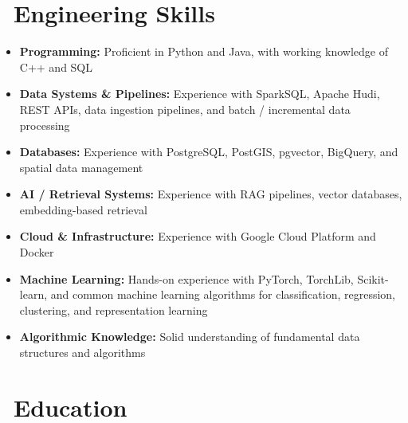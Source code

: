 \documentclass{resume}
\begin{document}
\section{\faCogs\ \textbf{Engineering Skills}}

\begin{itemize}[parsep=0.4ex]

\item \textbf{Programming:} Proficient in Python and Java, with working knowledge of C++ and SQL

\item \textbf{Data Systems \& Pipelines:} Experience with SparkSQL, Apache Hudi, REST APIs, data ingestion pipelines, and batch / incremental data processing

\item \textbf{Databases:} Experience with PostgreSQL, PostGIS, pgvector, BigQuery, and spatial data management

\item \textbf{AI / Retrieval Systems:} Experience with RAG pipelines, vector databases, embedding-based retrieval

\item \textbf{Cloud \& Infrastructure:} Experience with Google Cloud Platform and Docker

\item \textbf{Machine Learning:} Hands-on experience with PyTorch, TorchLib, Scikit-learn, and common machine learning algorithms for classification, regression, clustering, and representation learning

  \item \textbf{Algorithmic Knowledge:} Solid understanding of fundamental data structures and algorithms
\end{itemize}

\section{\faGraduationCap\ \textbf{Education}}

\end{document}
